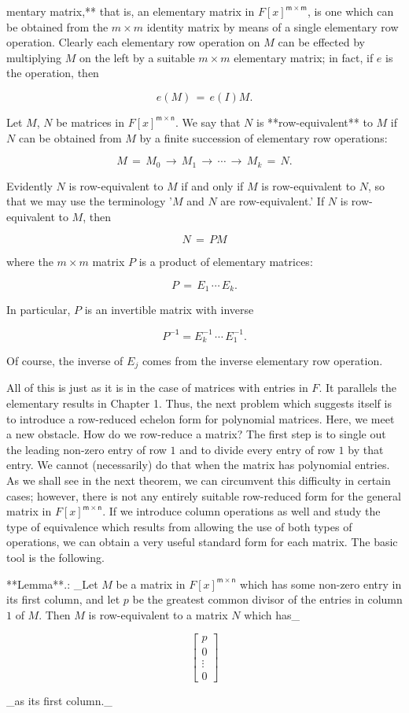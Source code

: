 mentary matrix,** that is, an elementary matrix in \(F[x]^{\mathsf{m}\times\mathsf{m}}\), is one which can be obtained from the \(m\times m\) identity matrix by means of a single elementary row operation. Clearly each elementary row operation on \(M\) can be effected by multiplying \(M\) on the left by a suitable \(m\times m\) elementary matrix; in fact, if \(e\) is the operation, then

\[e(M)\,=\,e(I)M.\]

Let \(M\), \(N\) be matrices in \(F[x]^{\mathsf{m}\times\mathsf{n}}\). We say that \(N\) is **row-equivalent** to \(M\) if \(N\) can be obtained from \(M\) by a finite succession of elementary row operations:

\[M\,=\,M_{0}\,\mathsf{\rightarrow}\,M_{1}\,\mathsf{\rightarrow}\,\cdots \,\mathsf{\rightarrow}\,M_{k}\,=\,N.\]

Evidently \(N\) is row-equivalent to \(M\) if and only if \(M\) is row-equivalent to \(N\), so that we may use the terminology '\(M\) and \(N\) are row-equivalent.' If \(N\) is row-equivalent to \(M\), then

\[N\,=\,PM\]

where the \(m\times m\) matrix \(P\) is a product of elementary matrices:

\[P\,=\,E_{1}\,\cdots\,E_{k}.\]

In particular, \(P\) is an invertible matrix with inverse

\[P^{\mathsf{-1}}=E_{k}^{-1}\,\cdots\,E_{1}^{-1}.\]

Of course, the inverse of \(E_{j}\) comes from the inverse elementary row operation.

All of this is just as it is in the case of matrices with entries in \(F\). It parallels the elementary results in Chapter 1. Thus, the next problem which suggests itself is to introduce a row-reduced echelon form for polynomial matrices. Here, we meet a new obstacle. How do we row-reduce a matrix? The first step is to single out the leading non-zero entry of row \(1\) and to divide every entry of row \(1\) by that entry. We cannot (necessarily) do that when the matrix has polynomial entries. As we shall see in the next theorem, we can circumvent this difficulty in certain cases; however, there is not any entirely suitable row-reduced form for the general matrix in \(F[x]^{\mathsf{m}\times\mathsf{n}}\). If we introduce column operations as well and study the type of equivalence which results from allowing the use of both types of operations, we can obtain a very useful standard form for each matrix. The basic tool is the following.

**Lemma**.: _Let \(M\) be a matrix in \(F[x]^{\mathsf{m}\times\mathsf{n}}\) which has some non-zero entry in its first column, and let \(p\) be the greatest common divisor of the entries in column \(1\) of \(M\). Then \(M\) is row-equivalent to a matrix \(N\) which has_

\[\left[\begin{array}{c}p\\ 0\\ \vdots\\ 0\end{array}\right]\]

_as its first column._ 